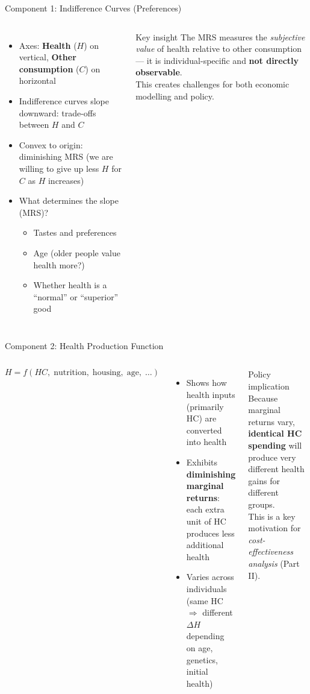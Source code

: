 \documentclass[aspectratio=169, 12pt]{beamer}
\begin{document}
\begin{frame}{Component 1: Indifference Curves (Preferences)}
  \begin{columns}
      \begin{itemize}
        \item Axes: \textbf{Health} ($H$) on vertical, \textbf{Other consumption} ($C$) on horizontal
        \item Indifference curves slope downward: trade-offs between $H$ and $C$
        \item Convex to origin: diminishing MRS (we are willing to give up less $H$ for $C$
              as $H$ increases)
        \item What determines the slope (MRS)?
        \begin{itemize}
          \item Tastes and preferences
          \item Age (older people value health more?)
          \item Whether health is a ``normal'' or ``superior'' good
        \end{itemize}
      \end{itemize}
      \begin{block}{Key insight}
        The MRS measures the \emph{subjective value} of health relative to other consumption ---
        it is individual-specific and \textbf{not directly observable}.\\[0.3em]
        This creates challenges for both economic modelling and policy.
      \end{block}
  \end{columns}
\end{frame}

\begin{frame}{Component 2: Health Production Function}
  \begin{columns}
      $$H = f(HC,\; \text{nutrition},\; \text{housing},\; \text{age},\; \ldots)$$
      \begin{itemize}
        \item Shows how health inputs (primarily HC) are converted into health
        \item Exhibits \textbf{diminishing marginal returns}: each extra unit of HC produces
              less additional health
        \item Varies across individuals (same HC $\Rightarrow$ different $\Delta H$ depending on
              age, genetics, initial health)
      \end{itemize}
      \begin{alertblock}{Policy implication}
        Because marginal returns vary, \textbf{identical HC spending} will produce very
        different health gains for different groups.\\[0.3em]
        This is a key motivation for \emph{cost-effectiveness analysis} (Part II).
      \end{alertblock}
  \end{columns}
\end{frame}
\end{document}
